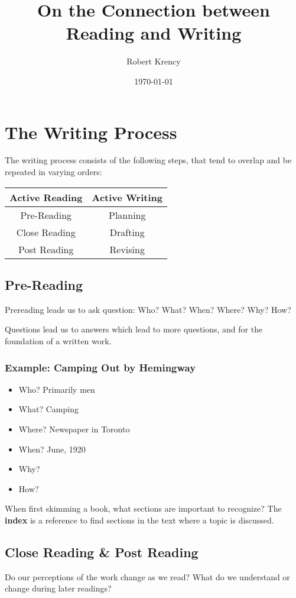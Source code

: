 \documentclass[12pt]{article}
\title{On the Connection between Reading and Writing}
\author{Robert Krency}
\date{\today}
\begin{document}
\section{The Writing Process}

The writing process consists of the following steps, that tend to overlap and be repeated in varying orders:

\begin{tabular}{c | c}
    Active Reading & Active Writing \\ \hline
    Pre-Reading & Planning \\
    Close Reading & Drafting \\
    Post Reading & Revising \\
\end{tabular}

\subsection{Pre-Reading}

Prereading leads us to ask question: Who? What? When? Where? Why? How?

Questions lead us to answers which lead to more questions, and for the foundation of a written work.

\subsubsection{Example: Camping Out by Hemingway}

\begin{itemize}
    \item Who? Primarily men
    \item What? Camping
    \item Where? Newspaper in Toronto
    \item When? June, 1920
    \item Why?
    \item How?
\end{itemize}

When first skimming a book, what sections are important to recognize?
The \textbf{index} is a reference to find sections in the text where a topic is discussed.


\subsection{Close Reading \& Post Reading}

Do our perceptions of the work change as we read?
What do we understand or change during later readings?
\end{document}
